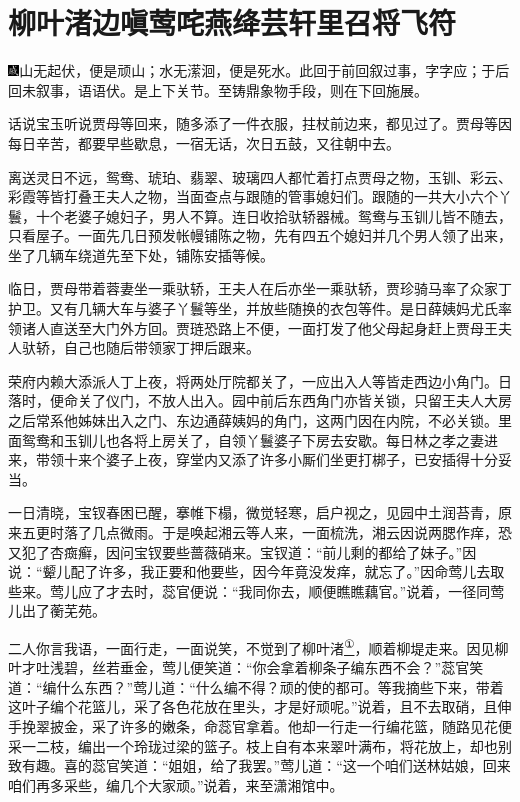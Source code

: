 

\chapter{柳叶渚边嗔莺咤燕\hspace{.5em}绛芸轩里召将飞符}

{\includegraphics[width=3mm]{../Images/00005}山无起伏，便是顽山；水无潆洄，便是死水。此回于前回叙过事，字字应；于后回未叙事，语语伏。是上下关节。至铸鼎象物手段，则在下回施展。}

话说宝玉听说贾母等回来，随多添了一件衣服，拄杖前边来，都见过了。贾母等因每日辛苦，都要早些歇息，一宿无话，次日五鼓，又往朝中去。

离送灵日不远，鸳鸯、琥珀、翡翠、玻璃四人都忙着打点贾母之物，玉钏、彩云、彩霞等皆打叠王夫人之物，当面查点与跟随的管事媳妇们。跟随的一共大小六个丫鬟，十个老婆子媳妇子，男人不算。连日收拾驮轿器械。鸳鸯与玉钏儿皆不随去，只看屋子。一面先几日预发帐幔铺陈之物，先有四五个媳妇并几个男人领了出来，坐了几辆车绕道先至下处，铺陈安插等候。

临日，贾母带着蓉妻坐一乘驮轿，王夫人在后亦坐一乘驮轿，贾珍骑马率了众家丁护卫。又有几辆大车与婆子丫鬟等坐，并放些随换的衣包等件。是日薛姨妈尤氏率领诸人直送至大门外方回。贾琏恐路上不便，一面打发了他父母起身赶上贾母王夫人驮轿，自己也随后带领家丁押后跟来。

荣府内赖大添派人丁上夜，将两处厅院都关了，一应出入人等皆走西边小角门。日落时，便命关了仪门，不放人出入。园中前后东西角门亦皆关锁，只留王夫人大房之后常系他姊妹出入之门、东边通薛姨妈的角门，这两门因在内院，不必关锁。里面鸳鸯和玉钏儿也各将上房关了，自领丫鬟婆子下房去安歇。每日林之孝之妻进来，带领十来个婆子上夜，穿堂内又添了许多小厮们坐更打梆子，已安插得十分妥当。

一日清晓，宝钗春困已醒，搴帷下榻，微觉轻寒，启户视之，见园中土润苔青，原来五更时落了几点微雨。于是唤起湘云等人来，一面梳洗，湘云因说两腮作痒，恐又犯了杏癍癣，因问宝钗要些蔷薇硝来。宝钗道：``前儿剩的都给了妹子。''因说：``颦儿配了许多，我正要和他要些，因今年竟没发痒，就忘了。''因命莺儿去取些来。莺儿应了才去时，蕊官便说：``我同你去，顺便瞧瞧藕官。''说着，一径同莺儿出了蘅芜苑。

二人你言我语，一面行走，一面说笑，不觉到了柳叶渚\href{../Text/part0063_split_000.html\#lnkback_1_a}{\textsuperscript{①}}，顺着柳堤走来。因见柳叶才吐浅碧，丝若垂金，莺儿便笑道：``你会拿着柳条子编东西不会？''蕊官笑道：``编什么东西？''莺儿道：``什么编不得？顽的使的都可。等我摘些下来，带着这叶子编个花篮儿，采了各色花放在里头，才是好顽呢。''说着，且不去取硝，且伸手挽翠披金，采了许多的嫩条，命蕊官拿着。他却一行走一行编花篮，随路见花便采一二枝，编出一个玲珑过梁的篮子。枝上自有本来翠叶满布，将花放上，却也别致有趣。喜的蕊官笑道：``姐姐，给了我罢。''莺儿道：``这一个咱们送林姑娘，回来咱们再多采些，编几个大家顽。''说着，来至潇湘馆中。

